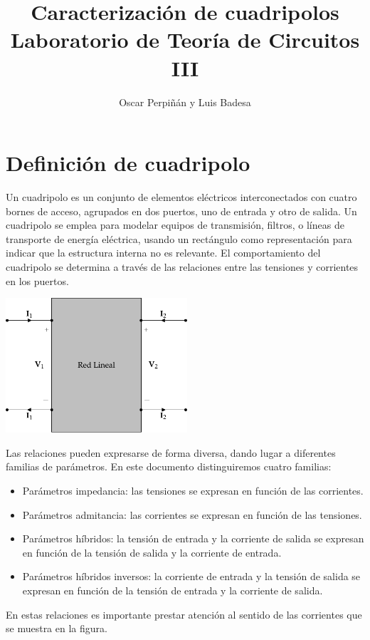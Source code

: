 \documentclass[10pt]{article}
\title{Caracterización de cuadripolos\\Laboratorio de Teoría de Circuitos III}
\author{Oscar Perpiñán y Luis Badesa}
\date{}
\begin{document}
\maketitle


\section{Definición de cuadripolo}

Un cuadripolo es un conjunto de elementos eléctricos interconectados con cuatro bornes de acceso, agrupados en dos puertos, uno de entrada y otro de salida. Un cuadripolo se emplea para modelar equipos de transmisión, filtros, o líneas de transporte de energía eléctrica, usando un rectángulo como representación para indicar que la estructura interna no es relevante. El comportamiento del cuadripolo se determina a través de las relaciones entre las tensiones y corrientes en los puertos. 
\begin{center}
\includegraphics[height=5cm]{../figs/cuadripolo.pdf}
\end{center}

Las relaciones pueden expresarse de forma diversa, dando lugar a diferentes familias de parámetros. En este documento distinguiremos cuatro familias:
\begin{itemize}
\item Parámetros impedancia: las tensiones se expresan en función de las corrientes.
\item Parámetros admitancia: las corrientes se expresan en función de las tensiones.
\item Parámetros híbridos: la tensión de entrada y la corriente de salida se expresan en función de la tensión de salida y la corriente de entrada.
\item Parámetros híbridos inversos: la corriente de entrada y la tensión de salida se expresan en función de la tensión de entrada y la corriente de salida.
\end{itemize}

En estas relaciones es importante prestar atención al sentido de las corrientes que se muestra en la figura.
\end{document}
